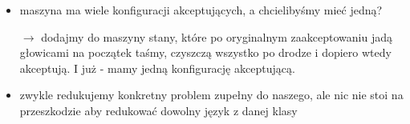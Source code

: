 \begin{itemize}
    \item maszyna ma wiele konfiguracji akceptujących, a chcielibyśmy mieć jedną?
    
    $\rightarrow$ dodajmy do maszyny stany, które po oryginalnym zaakceptowaniu jadą głowicami na początek taśmy, czyszczą wszystko po drodze i dopiero wtedy akceptują. I już - mamy jedną konfigurację akceptującą.
    
    \item zwykle redukujemy konkretny problem zupełny do naszego, ale nic nie stoi na przeszkodzie aby redukować dowolny język z danej klasy
    
\end{itemize}